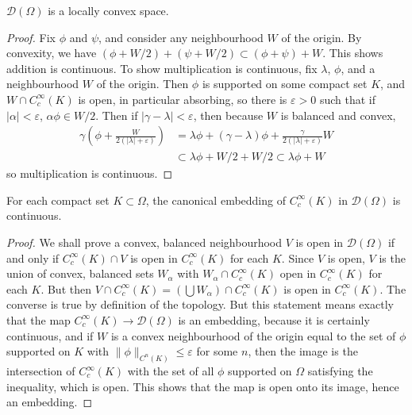 \begin{theorem}
    $\mathcal{D}(\Omega)$ is a locally convex space.
\end{theorem}
\begin{proof}
    Fix $\phi$ and $\psi$, and consider any neighbourhood $W$ of the origin. By convexity, we have $(\phi + W/2) + (\psi + W/2) \subset (\phi + \psi) + W$. This shows addition is continuous. To show multiplication is continuous, fix $\lambda$, $\phi$, and a neighbourhood $W$ of the origin. Then $\phi$ is supported on some compact set $K$, and $W \cap C_c^\infty(K)$ is open, in particular absorbing, so there is $\varepsilon > 0$ such that if $|\alpha| < \varepsilon$, $\alpha \phi \in W/2$. Then if $|\gamma - \lambda| < \varepsilon$, then because $W$ is balanced and convex,
    \begin{align*}
        \gamma \left(\phi + \frac{W}{2(|\lambda| + \varepsilon)} \right) &= \lambda \phi + (\gamma - \lambda) \phi + \frac{\gamma}{2(|\lambda| + \varepsilon)} W\\
        &\subset \lambda \phi + W/2 + W/2 \subset \lambda \phi + W
    \end{align*}
    so multiplication is continuous.
\end{proof}

\begin{theorem}
    For each compact set $K \subset \Omega$, the canonical embedding of $C_c^\infty(K)$ in $\mathcal{D}(\Omega)$ is continuous.
\end{theorem}
\begin{proof}
    We shall prove a convex, balanced neighbourhood $V$ is open in $\mathcal{D}(\Omega)$ if and only if $C_c^\infty(K) \cap V$ is open in $C_c^\infty(K)$ for each $K$. Since $V$ is open, $V$ is the union of convex, balanced sets $W_\alpha$ with $W_\alpha \cap C_c^\infty(K)$ open in $C_c^\infty(K)$ for each $K$. But then $V \cap C_c^\infty(K) = (\bigcup W_\alpha) \cap C_c^\infty(K)$ is open in $C_c^\infty(K)$. The converse is true by definition of the topology. But this statement means exactly that the map $C_c^\infty(K) \to \mathcal{D}(\Omega)$ is an embedding, because it is certainly continuous, and if $W$ is a convex neighbourhood of the origin equal to the set of $\phi$ supported on $K$ with $\| \phi \|_{C^n(K)} \leq \varepsilon$ for some $n$, then the image is the intersection of $C_c^\infty(K)$ with the set of all $\phi$ supported on $\Omega$ satisfying the inequality, which is open. This shows that the map is open onto its image, hence an embedding.
\end{proof}


